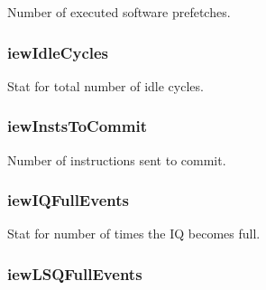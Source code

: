 \label{classDefaultIEW_ab4a8c8cadda04122d21fc9596057b8ce}
Number of executed software prefetches. \hypertarget{classDefaultIEW_a9da3679b5e992aaed3de418432902a59}{
\subsubsection[{iewIdleCycles}]{ {\bf iewIdleCycles}}}
\label{classDefaultIEW_a9da3679b5e992aaed3de418432902a59}
Stat for total number of idle cycles. \hypertarget{classDefaultIEW_ad02ecf3ed9ed64d465941dc4e5f402f9}{
\subsubsection[{iewInstsToCommit}]{ {\bf iewInstsToCommit}}}
\label{classDefaultIEW_ad02ecf3ed9ed64d465941dc4e5f402f9}
Number of instructions sent to commit. \hypertarget{classDefaultIEW_af14622d1e3f6f89130c87183c0fd31b1}{
\subsubsection[{iewIQFullEvents}]{ {\bf iewIQFullEvents}}}
\label{classDefaultIEW_af14622d1e3f6f89130c87183c0fd31b1}
Stat for number of times the IQ becomes full. \hypertarget{classDefaultIEW_a98fa20b7c9538614aaba18ecf7b96cf6}{
\subsubsection[{iewLSQFullEvents}]{ {\bf iewLSQFullEvents}}}
